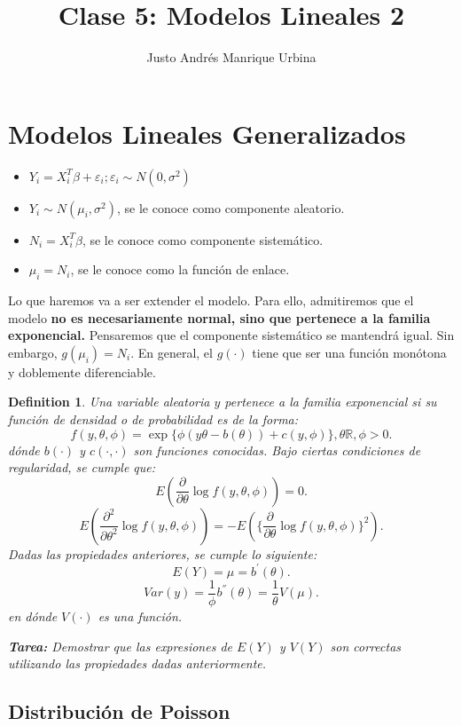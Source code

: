 \documentclass{article}
\title{Clase 5: Modelos Lineales 2}
\author{Justo Andrés Manrique Urbina}
\newtheorem{mydef}{Definition}
\begin{document}
\maketitle
\section{Modelos Lineales Generalizados}
\begin{itemize}
	\item $Y_{i}=X_{i}^{T}\beta+\varepsilon_{i}; \varepsilon_{i}\sim N(0,\sigma^{2})$
	\item $Y_{i}\sim N(\mu_{i},\sigma^{2})$, se le conoce como componente aleatorio.
	\item $N_{i} = X_{i}^{T}\beta$, se le conoce como componente sistemático.
	\item $\mu_{i}=N_{i}$, se le conoce como la función de enlace.
\end{itemize}

Lo que haremos va a ser extender el modelo. Para ello, admitiremos que el modelo \textbf{no es necesariamente normal, sino que pertenece a la familia exponencial.} Pensaremos que el componente sistemático se mantendrá igual. Sin embargo, $g(\mu_{i})=N_{i}$. En general, el $g(\cdot)$ tiene que ser una función monótona y doblemente diferenciable.

\begin{mydef}
Una variable aleatoria $y$ pertenece a la familia exponencial si su función de densidad o de probabilidad es de la forma:
\[ f(y,\theta,\phi)=\exp\{\phi{(y\theta-b{(\theta)})}+c{(y,\phi)}\}, \theta \mathbb{R}, \phi > 0.\]
dónde $b{(\cdot)}$ y $c{(\cdot,\cdot)}$ son funciones conocidas. Bajo ciertas condiciones de regularidad, se cumple que:
\[ E{(\frac{\partial }{\partial \theta}\log f{(y,\theta,\phi)})}=0.\]
\[ E{(\frac{\partial^{2}}{\partial \theta^{2}}\log f{(y,\theta,\phi)})}=-E{(\{\frac{\partial}{\partial \theta}\log f{(y,\theta,\phi)}\}^{2})}.\]
Dadas las propiedades anteriores, se cumple lo siguiente:
\[ E{(Y)}=\mu=b^{'}{(\theta)}.\]
\[ Var(y)=\frac{1}{\phi}b^{''}{(\theta)}=\frac{1}{\theta} V{(\mu)}.\]
en dónde $V(\cdot)$ es una función.

\textbf{Tarea: }Demostrar que las expresiones de $E(Y)$ y $V(Y)$ son correctas utilizando las propiedades dadas anteriormente.
\end{mydef}

\subsection{Distribución de Poisson}
\end{document}

